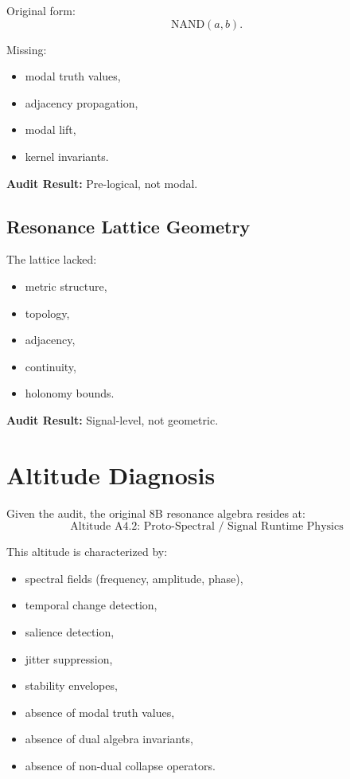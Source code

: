 \documentclass[11pt]{article}
\begin{document}
Original form:
\[
\mathrm{NAND}(a,b).
\]

Missing:
\begin{itemize}
  \item modal truth values,
  \item adjacency propagation,
  \item modal lift,
  \item kernel invariants.
\end{itemize}

\textbf{Audit Result:} Pre-logical, not modal.

\subsection{Resonance Lattice Geometry}

The lattice lacked:
\begin{itemize}
  \item metric structure,
  \item topology,
  \item adjacency,
  \item continuity,
  \item holonomy bounds.
\end{itemize}

\textbf{Audit Result:} Signal-level, not geometric.

\section{Altitude Diagnosis}

Given the audit, the original 8B resonance algebra resides at:
\[
\boxed{\text{Altitude A4.2: Proto-Spectral / Signal Runtime Physics}}
\]

This altitude is characterized by:
\begin{itemize}
  \item spectral fields (frequency, amplitude, phase),
  \item temporal change detection,
  \item salience detection,
  \item jitter suppression,
  \item stability envelopes,
  \item absence of modal truth values,
  \item absence of dual algebra invariants,
  \item absence of non-dual collapse operators.
\end{itemize}
\end{document}
